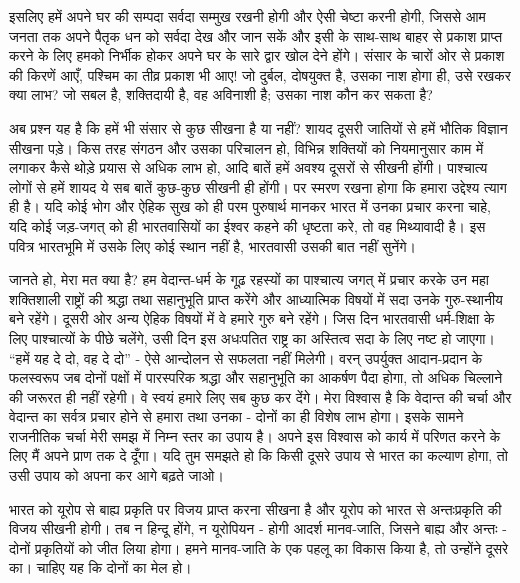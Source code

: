 इसलिए हमें अपने घर की सम्पदा सर्वदा सम्मुख रखनी होगी और ऐसी चेष्टा करनी होगी, जिससे आम जनता तक अपने पैतृक धन को सर्वदा देख और जान सकें और इसी के साथ-साथ बाहर से प्रकाश प्राप्त करने के लिए हमको निर्भीक होकर अपने घर के सारे द्वार खोल देने होंगे। संसार के चारों ओर से प्रकाश की किरणें आएँ, पश्चिम का तीव्र प्रकाश भी आए! जो दुर्बल, दोषयुक्त है, उसका नाश होगा ही, उसे रखकर क्या लाभ? जो सबल है, शक्तिदायी है, वह अविनाशी है; उसका नाश कौन कर सकता है? 

अब प्रश्न यह है कि हमें भी संसार से कुछ सीखना है या नहीं? शायद दूसरी जातियों से हमें भौतिक विज्ञान सीखना पड़े। किस तरह संगठन और उसका परिचालन हो, विभिन्न शक्तियों को नियमानुसार काम में लगाकर कैसे थोड़े प्रयास से अधिक लाभ हो, आदि बातें हमें अवश्य दूसरों से सीखनी होंगी। पाश्चात्य लोगों से हमें शायद ये सब बातें कुछ-कुछ सीखनी ही होंगी। पर स्मरण रखना होगा कि हमारा उद्देश्य त्याग ही है। यदि कोई भोग और ऐहिक सुख को ही परम पुरुषार्थ मानकर भारत में उनका प्रचार करना चाहे, यदि कोई जड़-जगत् को ही भारतवासियों का ईश्वर कहने की धृष्टता करे, तो वह मिथ्यावादी है। इस पवित्र भारतभूमि में उसके लिए कोई स्थान नहीं है, भारतवासी उसकी बात नहीं सुनेंगे। 

जानते हो, मेरा मत क्या है? हम वेदान्त-धर्म के गूढ़ रहस्यों का पाश्चात्य जगत् में प्रचार करके उन महा शक्तिशाली राष्ट्रों की श्रद्धा तथा सहानुभूति प्राप्त करेंगे और आध्यात्मिक विषयों में सदा उनके गुरु-स्थानीय बने रहेंगे। दूसरी ओर अन्य ऐहिक विषयों में वे हमारे गुरु बने रहेंगे। जिस दिन भारतवासी धर्म-शिक्षा के लिए पाश्चात्यों के पीछे चलेंगे, उसी दिन इस अधःपतित राष्ट्र का अस्तित्व सदा के लिए नष्ट हो जाएगा। “हमें यह दे दो, वह दे दो” - ऐसे आन्दोलन से सफलता नहीं मिलेगी। वरन् उपर्युक्त आदान-प्रदान के फलस्वरूप जब दोनों पक्षों में पारस्परिक श्रद्धा और सहानुभूति का आकर्षण पैदा होगा, तो अधिक चिल्लाने की जरूरत ही नहीं रहेगी। वे स्वयं हमारे लिए सब कुछ कर देंगे। मेरा विश्वास है कि वेदान्त की चर्चा और वेदान्त का सर्वत्र प्रचार होने से हमारा तथा उनका - दोनों का ही विशेष लाभ होगा। इसके सामने राजनीतिक चर्चा मेरी समझ में निम्न स्तर का उपाय है। अपने इस विश्वास को कार्य में परिणत करने के लिए मैं अपने प्राण तक दे दूँगा। यदि तुम समझते हो कि किसी दूसरे उपाय से भारत का कल्याण होगा, तो उसी उपाय को अपना कर आगे बढ़ते जाओ। 

भारत को यूरोप से बाह्य प्रकृति पर विजय प्राप्त करना सीखना है और यूरोप को भारत से अन्तःप्रकृति की विजय सीखनी होगी। तब न हिन्दू होंगे, न यूरोपियन - होगी आदर्श मानव-जाति, जिसने बाह्य और अन्तः - दोनों प्रकृतियों को जीत लिया होगा। हमने मानव-जाति के एक पहलू का विकास किया है, तो उन्होंने दूसरे का। चाहिए यह कि दोनों का मेल हो।


